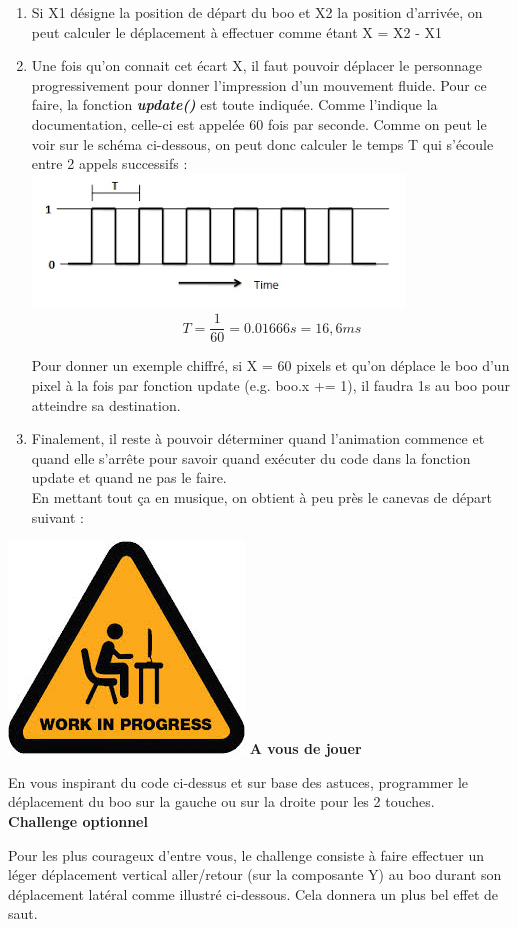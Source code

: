 \documentclass[french]{article}
\newcommand{\todo}{\includegraphics[scale=0.1]{work_in_progress}\textbf{ A vous de jouer\\} }
\begin{document}
\begin{enumerate}
	\item Si X1 désigne la position de départ du boo et X2 la position d'arrivée, on peut calculer le déplacement à effectuer comme étant X = X2 - X1\\
	
	\item Une fois qu'on connait cet écart X, il faut pouvoir déplacer le personnage progressivement pour donner l'impression d'un mouvement fluide. Pour ce faire, la fonction \textbf{\textit{update()}} est toute indiquée. Comme l'indique la documentation, celle-ci est appelée 60 fois par seconde. Comme on peut le voir sur le schéma ci-dessous, on peut donc calculer le temps T qui s'écoule entre 2 appels successifs : \\
	\includegraphics[scale=0.8]{horloge}
	\[T = \frac{1}{60} = 0.01666s = 16,6 ms\] 
	
	
	Pour donner un exemple chiffré, si X = 60 pixels et qu'on déplace le boo d'un pixel à la fois par fonction update (e.g. boo.x += 1), il faudra 1s au boo pour atteindre sa destination. \\
	
	\item Finalement, il reste à pouvoir déterminer quand l'animation commence et quand elle s'arrête pour savoir quand exécuter du code dans la fonction update et quand ne pas le faire.\\
	
	En mettant tout ça en musique, on obtient à peu près le canevas de départ suivant :
	
	
\end{enumerate}

\todo

En vous inspirant du code ci-dessus et sur base des astuces, programmer le déplacement du boo sur la gauche ou sur la droite pour les 2 touches.\\

\textbf{Challenge optionnel\\}

Pour les plus courageux d'entre vous, le challenge consiste à faire effectuer un léger déplacement vertical aller/retour (sur la composante Y) au boo durant son déplacement latéral comme illustré ci-dessous. Cela donnera un plus bel effet de saut.\\
\end{document}
